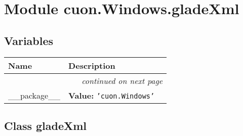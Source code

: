 %
%
%


\section{Module cuon.Windows.gladeXml}

    \label{cuon:Windows:gladeXml}


  \subsection{Variables}

    \vspace{-1cm}
\hspace{\varindent}\begin{longtable}{|p{\varnamewidth}|p{\vardescrwidth}|l}
\cline{1-2}
\cline{1-2} \centering \textbf{Name} & \centering \textbf{Description}& \\
\cline{1-2}
\endhead\cline{1-2}\multicolumn{3}{r}{\small\textit{continued on next page}}\\\endfoot\cline{1-2}
\endlastfoot\raggedright \_\-\_\-p\-a\-c\-k\-a\-g\-e\-\_\-\_\- & \raggedright \textbf{Value:} 
{\tt \texttt{'}\texttt{cuon.Windows}\texttt{'}}&\\
\cline{1-2}
\end{longtable}



\subsection{Class gladeXml}

